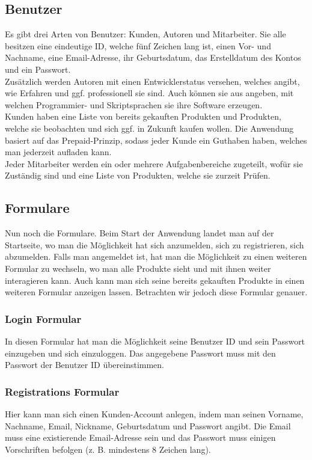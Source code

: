 \subsection{Benutzer}
Es gibt drei Arten von Benutzer: Kunden, Autoren und Mitarbeiter. Sie alle besitzen eine eindeutige ID, welche fünf Zeichen lang ist, einen Vor- und Nachname, eine Email-Adresse, ihr Geburtsdatum, das Erstelldatum des Kontos und ein Passwort.\\
Zusätzlich werden Autoren mit einen Entwicklerstatus versehen, welches angibt, wie Erfahren und ggf. professionell sie sind. Auch können sie aus angeben, mit welchen Programmier- und Skriptsprachen sie ihre Software erzeugen.\\
Kunden haben eine Liste von bereits gekauften Produkten und Produkten, welche sie beobachten und sich ggf. in Zukunft kaufen wollen. Die Anwendung basiert auf das Prepaid-Prinzip, sodass jeder Kunde ein Guthaben haben, welches man jederzeit aufladen kann.\\
Jeder Mitarbeiter werden ein oder mehrere Aufgabenbereiche zugeteilt, wofür sie Zuständig sind und eine Liste von Produkten, welche sie zurzeit Prüfen.

\subsection{Formulare}
Nun noch die Formulare. Beim Start der Anwendung landet man auf der Startseite, wo man die Möglichkeit hat sich anzumelden, sich zu registrieren, sich abzumelden. Falls man angemeldet ist, hat man die Möglichkeit zu einen weiteren Formular zu wechseln, wo man alle Produkte sieht und mit ihnen weiter interagieren kann. Auch kann man sich seine bereits gekauften Produkte in einen weiteren Formular anzeigen lassen. Betrachten wir jedoch diese Formular genauer.

\subsubsection{Login Formular}
In diesen Formular hat man die Möglichkeit seine Benutzer ID und sein Passwort einzugeben und sich einzuloggen. Das angegebene Passwort muss mit den Passwort der Benutzer ID übereinstimmen.

\subsubsection{Registrations Formular}
Hier kann man sich einen Kunden-Account anlegen, indem man seinen Vorname, Nachname, Email, Nickname, Geburtsdatum und Passwort angibt. Die Email muss eine existierende Email-Adresse sein und das Passwort muss einigen Vorschriften befolgen (z. B. mindestens 8 Zeichen lang).

